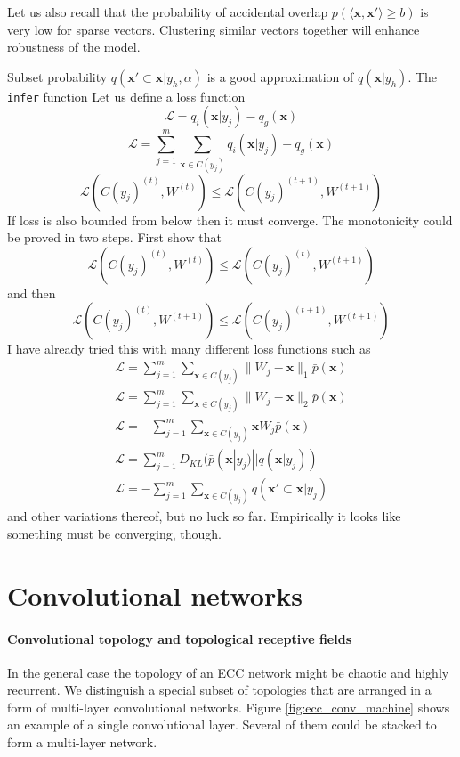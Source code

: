 \documentclass[12pt]{article}
\begin{document}
Let us also recall that the probability of accidental overlap $p(\langle\boldsymbol{x},\boldsymbol{x}'\rangle\ge b )$ is very low for sparse vectors.
Clustering similar vectors together will enhance robustness of the model.



Subset probability $q(\boldsymbol{x}' \subset \boldsymbol{x} |y_h,\alpha)$  is a good approximation of $q(\boldsymbol{x} |y_h)$.  The \texttt{infer} function 
Let us define a loss function
\[
\mathcal{L} = q_i(\boldsymbol{x}|y_j)-q_g(\boldsymbol{x})
\] 
\[
   \mathcal{L} = \sum_{j=1}^{m} \sum_{\boldsymbol{x}\in C(y_j)} q_i(\boldsymbol{x}|y_j)-q_g(\boldsymbol{x})
\] 
\[\mathcal{L}(C(y_j)^{(t)},W^{(t)})\le \mathcal{L}(C(y_j)^{(t+1)},W^{(t+1)})\] 
If loss is also bounded from below then it must converge. The monotonicity could be proved in two steps. First show that  
\[\mathcal{L}(C(y_j)^{(t)},W^{(t)})\le \mathcal{L}(C(y_j)^{(t)},W^{(t+1)})\] 
and then  
\[\mathcal{L}(C(y_j)^{(t)},W^{(t+1)})\le \mathcal{L}(C(y_j)^{(t+1)},W^{(t+1)})\] 
I have already tried this with many different loss functions such as
\begin{gather*}
\mathcal{L} = \sum_{j=1}^{m} \sum_{\boldsymbol{x}\in C(y_j)} \lVert  W_j - \boldsymbol{x}\rVert_1 \bar{p}(\boldsymbol{x}) \\
\mathcal{L} = \sum_{j=1}^{m} \sum_{\boldsymbol{x}\in C(y_j)} \lVert  W_j - \boldsymbol{x}\rVert_2 \bar{p}(\boldsymbol{x}) \\
\mathcal{L} = -\sum_{j=1}^{m} \sum_{\boldsymbol{x}\in C(y_j)} \boldsymbol{x}W_j  \bar{p}(\boldsymbol{x}) \\
\mathcal{L} = \sum_{j=1}^{m} D_{KL}(\bar{p}(\boldsymbol{x}|y_j)||q(\boldsymbol{x}|y_j))\\
\mathcal{L} =  -\sum_{j=1}^{m} \sum_{\boldsymbol{x}\in C(y_j)} q(\boldsymbol{x}'\subset \boldsymbol{x}|y_j)
\end{gather*}
and other variations thereof, but no luck so far. Empirically it looks like something must be converging, though.

\section{Convolutional networks}

\paragraph{Convolutional topology and topological receptive fields} In  the general case the topology of an ECC network might be chaotic and highly recurrent. We distinguish a special subset of topologies that are arranged in a form of multi-layer convolutional networks. Figure \ref{fig:ecc_conv_machine} shows an example of a single convolutional layer. Several of them could be stacked to form a multi-layer network. 
\end{document}
